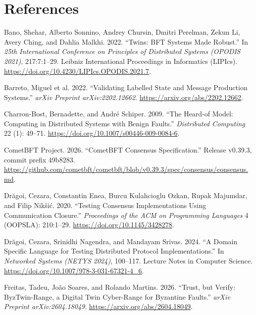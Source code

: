 \documentclass[10pt,a4paper]{article}
\newlength{\cslhangindent}
\newenvironment{CSLReferences}[2]
 {\begin{list}{}{%
  \setlength{\itemindent}{0pt}
  \setlength{\leftmargin}{0pt}
  \setlength{\parsep}{0pt}
  \ifodd #1
   \setlength{\leftmargin}{\cslhangindent}
   \setlength{\itemindent}{-1\cslhangindent}
  \fi
  \setlength{\itemsep}{#2\baselineskip}}}
 {\end{list}}
\begin{document}
\section*{References}\label{references}

\label{refs}
\begin{CSLReferences}{1}{0}
Bano, Shehar, Alberto Sonnino, Andrey Chursin, Dmitri Perelman, Zekun
Li, Avery Ching, and Dahlia Malkhi. 2022. {``Twins: {BFT} Systems Made
Robust.''} In \emph{25th International Conference on Principles of
Distributed Systems (OPODIS 2021)}, 217:7:1--29. Leibniz International
Proceedings in Informatics (LIPIcs).
\url{https://doi.org/10.4230/LIPIcs.OPODIS.2021.7}.

Barreto, Miguel et al. 2022. {``Validating Labelled State and Message
Production Systems.''} \emph{arXiv Preprint arXiv:2202.12662}.
\url{https://arxiv.org/abs/2202.12662}.

Charron-Bost, Bernadette, and André Schiper. 2009. {``The Heard-of
Model: Computing in Distributed Systems with Benign Faults.''}
\emph{Distributed Computing} 22 (1): 49--71.
\url{https://doi.org/10.1007/s00446-009-0084-6}.

CometBFT Project. 2026. {``CometBFT Consensus Specification.''} Release
v0.39.3, commit prefix 49b8283.
\url{https://github.com/cometbft/cometbft/blob/v0.39.3/spec/consensus/consensus.md}.

Drăgoi, Cezara, Constantin Enea, Burcu Kulahcioglu Ozkan, Rupak
Majumdar, and Filip Nikšić. 2020. {``Testing Consensus Implementations
Using Communication Closure.''} \emph{Proceedings of the ACM on
Programming Languages} 4 (OOPSLA): 210:1--29.
\url{https://doi.org/10.1145/3428278}.

Drăgoi, Cezara, Srinidhi Nagendra, and Mandayam Srivas. 2024. {``A
Domain Specific Language for Testing Distributed Protocol
Implementations.''} In \emph{Networked Systems (NETYS 2024)}, 100--117.
Lecture Notes in Computer Science.
\url{https://doi.org/10.1007/978-3-031-67321-4_6}.

Freitas, Tadeu, João Soares, and Rolando Martins. 2026. {``Trust, but
Verify: ByzTwin-Range, a Digital Twin Cyber-Range for Byzantine
Faults.''} \emph{arXiv Preprint arXiv:2604.18049}.
\url{https://arxiv.org/abs/2604.18049}.


\end{CSLReferences}
\end{document}
